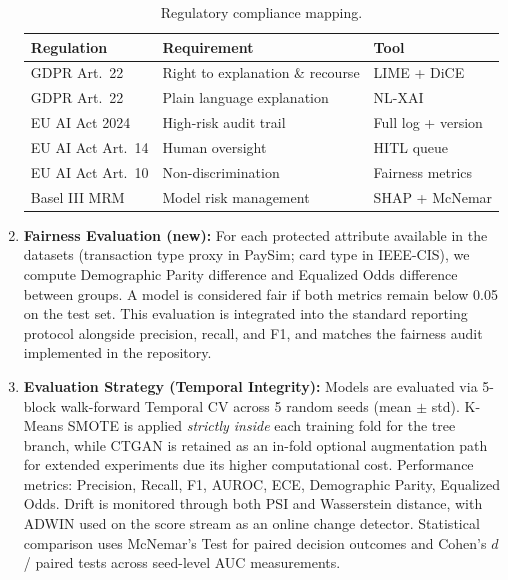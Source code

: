 \documentclass[10pt,a4paper,twocolumn]{article}
\begin{document}
\begin{enumerate}
    \begin{table}[H]
    \centering
    \caption{Regulatory compliance mapping.}
    \label{tab:regulatory}
    {\footnotesize
    \begin{tabularx}{\linewidth}{@{}lXl@{}}
    \toprule
    \textbf{Regulation} & \textbf{Requirement} & \textbf{Tool} \\
    \midrule
    GDPR Art.~22  & Right to explanation \& recourse & LIME + DiCE \\
    GDPR Art.~22  & Plain language explanation  & NL-XAI \\
    EU AI Act 2024 & High-risk audit trail      & Full log + version \\
    EU AI Act Art.~14 & Human oversight       & HITL queue \\
    EU AI Act Art.~10 & Non-discrimination    & Fairness metrics \\
    Basel III MRM & Model risk management      & SHAP + McNemar \\
    \bottomrule
    \end{tabularx}
    }
    \end{table}

    \item \textbf{Fairness Evaluation (new):} For each protected attribute available in the datasets (transaction type proxy in PaySim; card type in IEEE-CIS), we compute Demographic Parity difference and Equalized Odds difference between groups. A model is considered fair if both metrics remain below 0.05 on the test set. This evaluation is integrated into the standard reporting protocol alongside precision, recall, and F1, and matches the fairness audit implemented in the repository.

    \item \textbf{Evaluation Strategy (Temporal Integrity):} Models are evaluated via 5-block walk-forward Temporal CV across 5 random seeds (mean $\pm$ std). K-Means SMOTE is applied \textit{strictly inside} each training fold for the tree branch, while CTGAN is retained as an in-fold optional augmentation path for extended experiments due its higher computational cost. Performance metrics: Precision, Recall, F1, AUROC, ECE, Demographic Parity, Equalized Odds. Drift is monitored through both PSI and Wasserstein distance, with ADWIN used on the score stream as an online change detector. Statistical comparison uses McNemar's Test for paired decision outcomes and Cohen's $d$ / paired tests across seed-level AUC measurements.
\end{enumerate}
\end{document}
